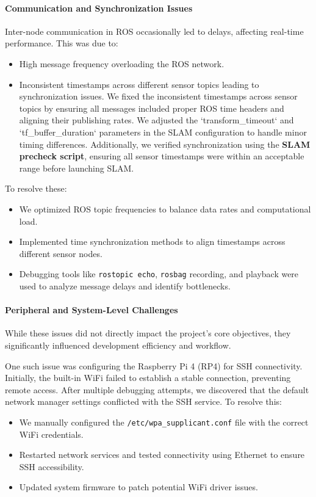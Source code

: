 \documentclass[english,project]{buwthesis}
\begin{document}
\paragraph{Communication and Synchronization Issues}
Inter-node communication in ROS occasionally led to delays, affecting real-time performance. This was due to:
\begin{itemize}
\item High message frequency overloading the ROS network.

\item Inconsistent timestamps across different sensor topics leading to synchronization issues. We fixed the inconsistent timestamps across sensor topics by ensuring all messages included proper ROS time headers and aligning their publishing rates. We adjusted the `transform\_timeout` and `tf\_buffer\_duration` parameters in the SLAM configuration to handle minor timing differences. Additionally, we verified synchronization using the \textbf{SLAM precheck script}, ensuring all sensor timestamps were within an acceptable range before launching SLAM.
\end{itemize}


To resolve these:
\begin{itemize}
\item We optimized ROS topic frequencies to balance data rates and computational load.
\item Implemented time synchronization methods to align timestamps across different sensor nodes.
\item Debugging tools like \texttt{rostopic echo}, \texttt{rosbag} recording, and playback were used to analyze message delays and identify bottlenecks.
\end{itemize}

\paragraph{Peripheral and System-Level Challenges}
While these issues did not directly impact the project's core objectives, they significantly influenced development efficiency and workflow.

One such issue was configuring the Raspberry Pi 4 (RP4) for SSH connectivity. Initially, the built-in WiFi failed to establish a stable connection, preventing remote access. After multiple debugging attempts, we discovered that the default network manager settings conflicted with the SSH service. To resolve this:
\begin{itemize}
\item We manually configured the \texttt{/etc/wpa\_supplicant.conf} file with the correct WiFi credentials.
\item Restarted network services and tested connectivity using Ethernet to ensure SSH accessibility.
\item Updated system firmware to patch potential WiFi driver issues.
\end{itemize}
\end{document}
